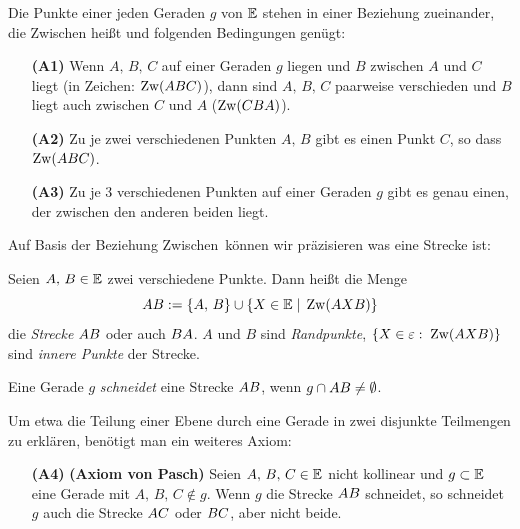 Die Punkte einer jeden Geraden $g$ von $\mathbb E$ stehen in einer
Beziehung zueinander, die \glqq{}Zwischen\grqq{} hei{\ss}t
und folgenden Bedingungen gen\"{u}gt:

\begin{enumerate}
    \item[{\bf (A1)}] Wenn $A,\,B,\,C$ auf einer Geraden $g$ liegen und $B$ zwischen $A$ und $C$
    liegt (in Zeichen: $\operatorname{Zw}(ABC)$), dann sind $A,\,B,\,C$ paarweise
    verschieden und $B$ liegt auch zwischen $C$ und $A$ ($\operatorname{Zw}(CBA)$).
    \item[{\bf (A2)}] Zu je zwei verschiedenen Punkten $A,\,B$ gibt es
    einen Punkt $C$, so dass $\operatorname{Zw}(ABC)$.
    \item[{\bf (A3)}] Zu je 3 verschiedenen Punkten auf einer Geraden
    $g$ gibt es genau einen, der zwischen den anderen beiden
    liegt.
\end{enumerate}



Auf Basis der Beziehung \glqq Zwischen\grqq\ können wir präzisieren was eine
Strecke ist:

\begin{defi}[Strecke]
Seien $A,\,B\in \mathbb E$ zwei verschiedene
Punkte. Dann hei{\ss}t die Menge
\[
{AB}:=\{A,\,B\}\cup\{X\in\mathbb E \; | \;\operatorname{Zw}(AXB)\}
\] 
die {\em Strecke} ${AB}$ oder auch ${BA}$. 
$A$ und $B$ sind {\em Randpunkte},
$\{X\in\varepsilon:\;\operatorname{Zw}(AXB)\}$ sind {\em innere Punkte} der Strecke.
\end{defi}


Eine Gerade $g$ \emph{schneidet} eine Strecke ${AB}$, wenn $g\cap{AB}\neq \emptyset$.


Um etwa die Teilung einer Ebene durch eine Gerade in zwei
disjunkte Teilmengen 
zu erkl\"{a}ren, 
ben\"{o}tigt man ein weiteres Axiom:



\begin{enumerate}
    \item[{\bf (A4)}] {\bf (Axiom von Pasch)} Seien $A,\,B,\,C\in\mathbb E$
    nicht kollinear und $g\subset\mathbb E$ eine Gerade mit
    $A,\,B,\,C\notin g$. Wenn $g$ die Strecke ${AB}$ schneidet, so schneidet
    $g$ auch die Strecke ${AC}$ oder ${BC}$, aber nicht
    beide. 
\end{enumerate}

